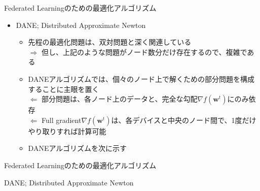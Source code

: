 \documentclass[dvipdfmx,notheorems,t]{beamer}
\begin{document}
\begin{frame}{Federated Learningのための最適化アルゴリズム}

\begin{itemize}
	\item DANE; Distributed Approximate Newton
	\begin{itemize}
		\item 先程の最適化問題は、双対問題と深く関連している \\
		$\Rightarrow$ 但し、上記のような問題がノード数分だけ存在するので、複雑である
		\newline
		
		\item DANEアルゴリズムでは、個々のノード上で解くための部分問題を構成することに主眼を置く \\
		$\Leftarrow$ 部分問題は、各ノード上のデータと、完全な勾配$\nabla f(\bm{w}^t)$にのみ依存 \\
		$\Leftarrow$ Full gradient$\nabla f(\bm{w}^t)$は、各デバイスと中央のノード間で、1度だけやり取りすれば計算可能
		\newline
		
		\item DANEアルゴリズムを次に示す
	\end{itemize}
\end{itemize}

\end{frame}

\begin{frame}{Federated Learningのための最適化アルゴリズム}

\begin{algorithm}[H]
	\DontPrintSemicolon
	\caption{DANE; Distributed Approximate Newton ~\cite{1610.02527}}
	\label{alg:dane}
	\begin{algorithmic}[1]
		\ENDFOR
	\end{algorithmic}
\end{algorithm}

\end{frame}
\end{document}
